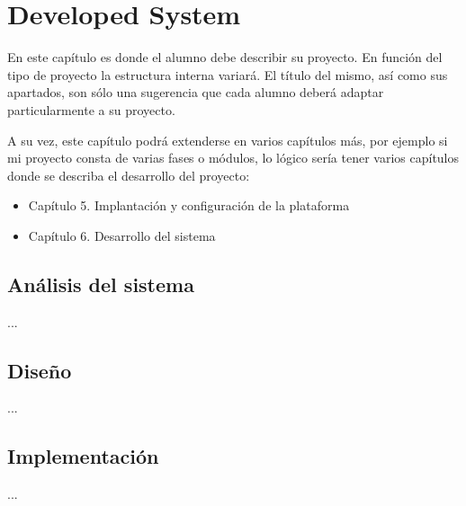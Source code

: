 \chapter{Developed System}
	En este capítulo es donde el alumno debe describir su proyecto. En función del tipo de proyecto la estructura interna variará. El título del mismo, así como sus apartados, son sólo una sugerencia que cada alumno deberá adaptar particularmente a su proyecto.
	
	A su vez, este capítulo podrá extenderse en varios capítulos más, por ejemplo si mi proyecto consta de varias fases o módulos, lo lógico sería tener varios capítulos donde se describa el desarrollo del proyecto:

    \begin{itemize}
    	\item Capítulo 5. Implantación y configuración de la plataforma 
    	\item Capítulo 6. Desarrollo del sistema
    \end{itemize}
	
	\section{Análisis del sistema}
		...
	\section{Diseño}
		...
	\section{Implementación}
		...